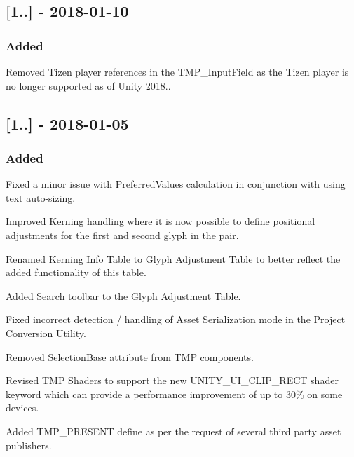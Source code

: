 \subsection*{\mbox{[}1..\mbox{]} -\/ 2018-\/01-\/10}

\subsubsection*{Added}


\begin{DoxyItemize}
\item Removed Tizen player references in the T\+M\+P\+\_\+\+Input\+Field as the Tizen player is no longer supported as of Unity 2018..
\end{DoxyItemize}

\subsection*{\mbox{[}1..\mbox{]} -\/ 2018-\/01-\/05}

\subsubsection*{Added}


\begin{DoxyItemize}
\item Fixed a minor issue with Preferred\+Values calculation in conjunction with using text auto-\/sizing.
\item Improved Kerning handling where it is now possible to define positional adjustments for the first and second glyph in the pair.
\item Renamed Kerning Info Table to Glyph Adjustment Table to better reflect the added functionality of this table.
\item Added Search toolbar to the Glyph Adjustment Table.
\item Fixed incorrect detection / handling of Asset Serialization mode in the Project Conversion Utility.
\item Removed Selection\+Base attribute from T\+MP components.
\item Revised T\+MP Shaders to support the new U\+N\+I\+T\+Y\+\_\+\+U\+I\+\_\+\+C\+L\+I\+P\+\_\+\+R\+E\+CT shader keyword which can provide a performance improvement of up to 30\% on some devices.
\item Added T\+M\+P\+\_\+\+P\+R\+E\+S\+E\+NT define as per the request of several third party asset publishers.
\end{DoxyItemize}


